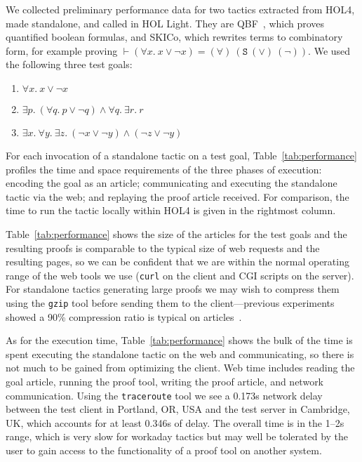 \documentclass{llncs}
\begin{document}
We collected preliminary performance data for two tactics extracted from HOL4, made standalone, and called in HOL Light.
They are QBF~\cite{DBLP:conf/itp/KumarW11}, which proves quantified boolean formulas, and SKICo, which rewrites terms to combinatory form, for example proving $\vdash(\forall{x}.\ x\lor\lnot x)=(\forall)\ (\mathtt{S}\ (\lor)\ (\lnot))$.
We used the following three test goals:
\begin{enumerate}
\item $\forall x.\ x \lor\lnot x$

\item $\exists p.\ (\forall q.\ p \lor\lnot q) \land\forall q.\ \exists r.\ r$

\item $\exists x.\ \forall y.\ \exists z.\ (\lnot x \lor\lnot y) \land (\lnot z\lor\lnot y)$
\end{enumerate}
For each invocation of a standalone tactic on a test goal, Table~\ref{tab:performance} profiles the time and space requirements of the three phases of execution: encoding the goal as an article; communicating and executing the standalone tactic via the web; and replaying the proof article received.
For comparison, the time to run the tactic locally within HOL4 is given in the rightmost column.

Table~\ref{tab:performance} shows the size of the articles for the test goals and the resulting proofs is comparable to the typical size of web requests and the resulting pages, so we can be confident that we are within the normal operating range of the web tools we use (\texttt{curl} on the client and CGI scripts on the server). For standalone tactics generating large proofs we may wish to compress them using the \texttt{gzip} tool before sending them to the client---previous experiments showed a 90\% compression ratio is typical on articles~\cite{hurd2009}.

As for the execution time, Table~\ref{tab:performance} shows the bulk of the time is spent executing the standalone tactic on the web and communicating, so there is not much to be gained from optimizing the client.
Web time includes reading the goal article, running the proof tool, writing the proof article, and network communication.
Using the \texttt{traceroute} tool we see a 0.173s network delay between the test client in Portland, OR, USA and the test server in Cambridge, UK, which accounts for at least 0.346s of delay.
The overall time is in the 1--2s range, which is very slow for workaday tactics but may well be tolerated by the user to gain access to the functionality of a proof tool on another system.
\end{document}
